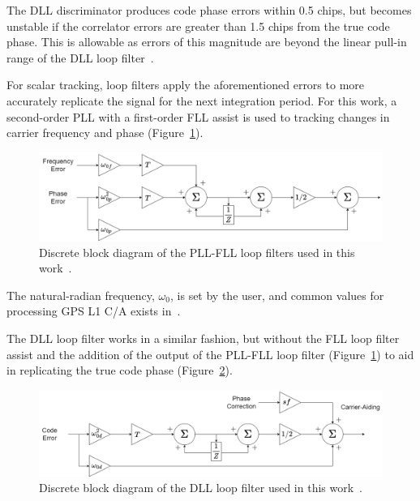 The DLL discriminator produces code phase errors within 0.5 chips, but becomes unstable if the correlator errors are greater than 1.5 chips from the true code phase. This is allowable as errors of this magnitude are beyond the linear pull-in range of the DLL loop filter~\cite{kaplanUnderstandingGPSPrinciples2006}.

For scalar tracking, loop filters apply the aforementioned errors to more accurately replicate the signal for the next integration period. For this work, a second-order PLL with a first-order FLL assist is used to tracking changes in carrier frequency and phase (Figure~\ref{fig:PLL}).

\begin{figure}[!ht]
    \centering
    \includegraphics[width=\linewidth]{Figures/PLL.png}
    \caption{Discrete block diagram of the PLL-FLL loop filters used in this work~\cite{kaplanUnderstandingGPSPrinciples2006}.}\label{fig:PLL}
\end{figure}

The natural-radian frequency, \(\omega_0\), is set by the user, and common values for processing GPS L1 C/A exists in~\cite{kaplanUnderstandingGPSPrinciples2006}.

The DLL loop filter works in a similar fashion, but without the FLL loop filter assist and the addition of the output of the PLL-FLL loop filter (Figure~\ref{fig:PLL}) to aid in replicating the true code phase (Figure~\ref{fig:DLL}).

\begin{figure}[!ht]
    \centering
    \includegraphics[width=\linewidth]{Figures/DLL.png}
    \caption{Discrete block diagram of the DLL loop filter used in this work~\cite{kaplanUnderstandingGPSPrinciples2006}.}\label{fig:DLL}
\end{figure}

